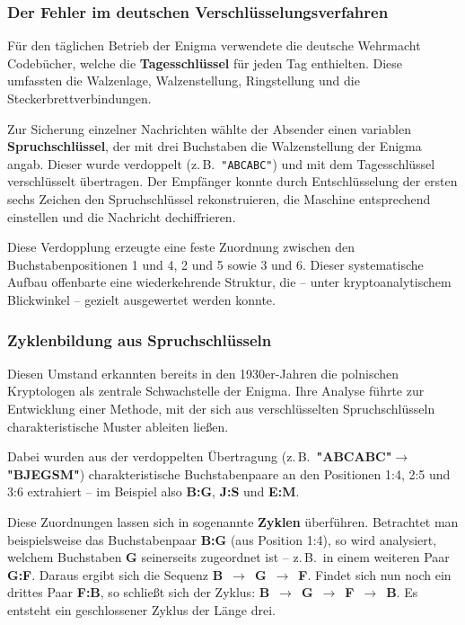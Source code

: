 \documentclass[12pt, ngerman, a4paper, numbers=noenddot]{article}
\begin{document}
\subsubsection{Der Fehler im deutschen Verschlüsselungsverfahren}

Für den täglichen Betrieb der Enigma verwendete die deutsche Wehrmacht Codebücher, welche die \textbf{Tagesschlüssel} für jeden Tag enthielten. Diese umfassten die Walzenlage, Walzenstellung, Ringstellung und die Steckerbrettverbindungen.

Zur Sicherung einzelner Nachrichten wählte der Absender einen variablen \textbf{Spruchschlüssel}, der mit drei Buchstaben die Walzenstellung der Enigma angab. Dieser wurde verdoppelt (z.\,B.\ \lstinline|"ABCABC"|) und mit dem Tagesschlüssel verschlüsselt übertragen. Der Empfänger konnte durch Entschlüsselung der ersten sechs Zeichen den Spruchschlüssel rekonstruieren, die Maschine entsprechend einstellen und die Nachricht dechiffrieren.

Diese Verdopplung erzeugte eine feste Zuordnung zwischen den Buchstabenpositionen 1 und 4, 2 und 5 sowie 3 und 6. Dieser systematische Aufbau offenbarte eine wiederkehrende Struktur, die – unter kryptoanalytischem Blickwinkel – gezielt ausgewertet werden konnte.



\subsubsection{Zyklenbildung aus Spruchschlüsseln}
Diesen Umstand erkannten bereits in den 1930er-Jahren die polnischen Kryptologen als zentrale Schwachstelle der Enigma. Ihre Analyse führte zur Entwicklung einer Methode, mit der sich aus verschlüsselten Spruchschlüsseln charakteristische Muster ableiten ließen. 

Dabei wurden aus der verdoppelten Übertragung (z.\,B.\ \textbf{"ABCABC"}\newline $\rightarrow$ \textbf{"BJEGSM"}) charakteristische Buchstabenpaare an den Positionen 1:4, 2:5 und 3:6 extrahiert – im Beispiel also \textbf{B:G}, \textbf{J:S} und \textbf{E:M}.

Diese Zuordnungen lassen sich in sogenannte \textbf{Zyklen} überführen. Betrachtet man beispielsweise das Buchstabenpaar \textbf{B:G} (aus Position 1:4), so wird analysiert, welchem Buchstaben \textbf{G} seinerseits zugeordnet ist – z.\,B.\ in einem weiteren Paar \textbf{G:F}. Daraus ergibt sich die Sequenz \textbf{B}~$\rightarrow$~\textbf{G}~$\rightarrow$~\textbf{F}. Findet sich nun noch ein drittes Paar \textbf{F:B}, so schließt sich der Zyklus: \textbf{B}~$\rightarrow$~\textbf{G}~$\rightarrow$~\textbf{F}~$\rightarrow$~\textbf{B}. Es entsteht ein geschlossener Zyklus der Länge drei.
\end{document}
